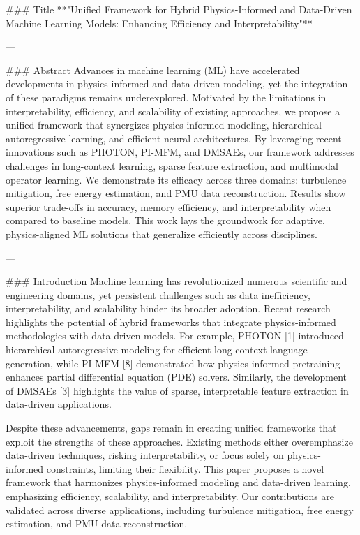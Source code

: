 ### Title
**"Unified Framework for Hybrid Physics-Informed and Data-Driven Machine Learning Models: Enhancing Efficiency and Interpretability"**

---

### Abstract
Advances in machine learning (ML) have accelerated developments in physics-informed and data-driven modeling, yet the integration of these paradigms remains underexplored. Motivated by the limitations in interpretability, efficiency, and scalability of existing approaches, we propose a unified framework that synergizes physics-informed modeling, hierarchical autoregressive learning, and efficient neural architectures. By leveraging recent innovations such as PHOTON, PI-MFM, and DMSAEs, our framework addresses challenges in long-context learning, sparse feature extraction, and multimodal operator learning. We demonstrate its efficacy across three domains: turbulence mitigation, free energy estimation, and PMU data reconstruction. Results show superior trade-offs in accuracy, memory efficiency, and interpretability when compared to baseline models. This work lays the groundwork for adaptive, physics-aligned ML solutions that generalize efficiently across disciplines.

---

### Introduction
Machine learning has revolutionized numerous scientific and engineering domains, yet persistent challenges such as data inefficiency, interpretability, and scalability hinder its broader adoption. Recent research highlights the potential of hybrid frameworks that integrate physics-informed methodologies with data-driven models. For example, PHOTON [1] introduced hierarchical autoregressive modeling for efficient long-context language generation, while PI-MFM [8] demonstrated how physics-informed pretraining enhances partial differential equation (PDE) solvers. Similarly, the development of DMSAEs [3] highlights the value of sparse, interpretable feature extraction in data-driven applications.

Despite these advancements, gaps remain in creating unified frameworks that exploit the strengths of these approaches. Existing methods either overemphasize data-driven techniques, risking interpretability, or focus solely on physics-informed constraints, limiting their flexibility. This paper proposes a novel framework that harmonizes physics-informed modeling and data-driven learning, emphasizing efficiency, scalability, and interpretability. Our contributions are validated across diverse applications, including turbulence mitigation, free energy estimation, and PMU data reconstruction.

